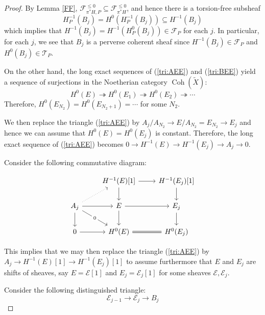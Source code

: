 \documentclass[12pt]{amsart}
\theoremstyle{definition}
\DeclareMathOperator{\Coh}{Coh}
\begin{document}
\begin{proof}
By Lemma \ref{FF}, $\mathcal{F}^{\leq 0}_{\pi^\ast H, P} \subseteq  \mathcal{F}^{\leq 0}_{\pi^\ast H}$,
and hence there is a torsion-free subsheaf $$H^{-1}_P(B_j) = H^0(H^{-1}_P(B_j)) \subseteq H^{-1}(B_j)$$
which implies that $H^{-1}(B_j)=H^{-1}(H^0_P(B_j))\in \mathcal{F}_P$ for each $j$.
In particular, for each $j$, we see that $B_j$ is a perverse coherent sheaf  since $H^{-1}(B_j) \in \mathcal{F}_P$ and $H^0(B_j) \in \mathcal{T}_P$.


On the other hand, the long exact sequences of (\ref{tri:AEE}) and (\ref{tri:BEE}) yield a sequence of surjections in the Noetherian category $\Coh(\widetilde{X})$:
$$ H^0(E) \twoheadrightarrow H^0(E_1) \twoheadrightarrow H^0(E_2) \twoheadrightarrow \cdots$$
Therefore, $H^0(E_{N_2}) = H^0(E_{N_2+1}) = \cdots$ for some $N_2$.

We then replace the triangle (\ref{tri:AEE}) by $A_j/A_{N_2} \longrightarrow E/A_{N_2}=E_{N_2} \longrightarrow E_j$ and hence we can assume that $H^0(E)=H^0(E_j)$ is constant.
Therefore, the long exact sequence  of (\ref{tri:AEE})
becomes $0 \longrightarrow H^{-1}(E) \longrightarrow H^{-1}(E_j) \longrightarrow A_j \longrightarrow 0$.

Consider the following commutative diagram:

\[
\begin{tikzcd}
 & {H^{-1}(E)[1]} \arrow[r] \arrow[d]    & {H^{-1}(E_j)[1]} \arrow[d] \\
A_j \arrow[d] \arrow[r] \arrow[rd, "0" description] \arrow[ru, dotted] & E \arrow[d] \arrow[r]                 & E_j \arrow[d]  \\
0 \arrow[r]                                                            & H^0(E) \arrow[r, Rightarrow, no head] & H^0(E_j)                  
\end{tikzcd}
\]  

This implies that we may then replace the triangle (\ref{tri:AEE}) by $A_j \longrightarrow H^{-1}(E)[1] \longrightarrow H^{-1}(E_j)[1]$ 
to assume furthermore that $E$ and $E_j$ are shifts of sheaves, say $E=\mathcal{E}[1]$ and $E_j=\mathcal{E}_j[1]$ for some sheaves $\mathcal{E},\mathcal{E}_j$.

Consider the following distinguished triangle:
\begin{equation}\label{tri:EEB}
 \mathcal{E}_{j-1} \longrightarrow \mathcal{E}_j \longrightarrow B_j 
\end{equation}



\end{proof}
\end{document}
